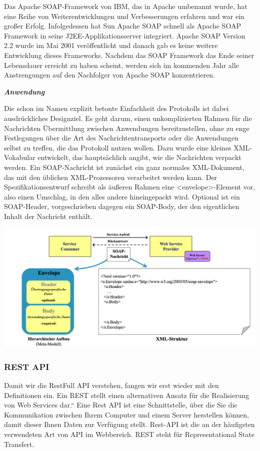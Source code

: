 Das Apache SOAP-Framework von IBM, das in Apache umbenannt wurde, hat eine Reihe von Weiterentwicklungen und Verbesserungen erfahren und war ein großer Erfolg. Infolgedessen hat Sun Apache SOAP schnell als Apache SOAP Framework in seine J2EE-Applikationsserver integriert. Apache SOAP Version 2.2 wurde im Mai 2001 veröffentlicht und danach gab es keine weitere Entwicklung dieses Frameworks. Nachdem das SOAP Framework das Ende seiner Lebensdauer erreicht zu haben scheint, werden sich im kommenden Jahr alle Anstrengungen auf den Nachfolger von Apache SOAP konzentrieren.

\textit{\textbf{Anwendung}}

Die schon im Namen explizit betonte Einfachheit des Protokolls ist dabei ausdrückliches Designziel. Es geht darum, einen unkomplizierten Rahmen für die Nachrichten Übermittlung zwischen Anwendungen bereitzustellen, ohne zu enge Festlegungen über die Art des Nachrichtentransports oder die Anwendungen selbst zu treffen, die das Protokoll nutzen wollen. Dazu wurde eine kleines XML-Vokabular entwickelt, das hauptsächlich angibt, wie die Nachrichten verpackt werden. Ein SOAP-Nachricht ist zunächst ein ganz normales XML-Dokument, das mit den üblichen XML-Prozessoren verarbeitet werden kann. Der Spezifikationsentwurf schreibt als äußeren Rahmen eine <envelope>-Element vor, also einen Umschlag, in den alles andere hineingepackt wird. Optional ist ein SOAP-Header, vorgeschrieben dagegen ein SOAP-Body, der den eigentlichen Inhalt der Nachricht enthält.\cite{helmut529_30}

\begin{center}
\includegraphics[scale=.4]{images/Struktur_ein_SOAP} \cite{alda}
\end{center}

\subsubsection{REST API}
Damit wir die RestFull \ac{API} verstehen, fangen wir erst wieder mit den Definitionen ein.
Ein \ac{REST} stellt einen alternativen Ansatz für die Realisierung von Web Services dar.“ Eine Rest API ist eine Schnittstelle, über die Sie die Kommunikation zwischen Ihrem Computer und einem Server herstellen können, damit dieser Ihnen Daten zur Verfügung stellt. Rest-API ist die an der häufigsten verwendeten Art von API im Webbereich. REST steht für Representational State Transfert.\cite{alda}

